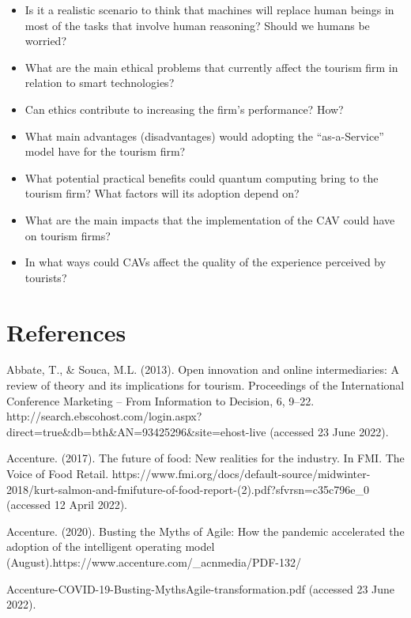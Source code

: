 \documentclass[
  letterpaper,
  DIV=11,
  numbers=noendperiod]{scrreprt}
\begin{document}
\begin{itemize}
\item
  Is it a realistic scenario to think that machines will replace human
  beings in most of the tasks that involve human reasoning? Should we
  humans be worried?
\item
  What are the main ethical problems that currently affect the tourism
  firm in relation to smart technologies?
\item
  Can ethics contribute to increasing the firm's performance? How?
\item
  What main advantages (disadvantages) would adopting the
  ``as-a-Service'' model have for the tourism firm?
\item
  What potential practical benefits could quantum computing bring to the
  tourism firm? What factors will its adoption depend on?
\item
  What are the main impacts that the implementation of the CAV could
  have on tourism firms?
\item
  In what ways could CAVs affect the quality of the experience perceived
  by tourists?
\end{itemize}


\hypertarget{references}{%
\chapter*{References}\label{references}}


Abbate, T., \& Souca, M.L. (2013). Open innovation and online
intermediaries: A review of theory and its implications for tourism.
Proceedings of the International Conference Marketing -- From
Information to Decision, 6, 9--22.
http://search.ebscohost.com/login.aspx?direct=true\&db=bth\&AN=93425296\&site=ehost-live
(accessed 23 June 2022).

Accenture. (2017). The future of food: New realities for the industry.
In FMI. The Voice of Food Retail.
https://www.fmi.org/docs/default-source/midwinter-2018/kurt-salmon-and-fmifuture-of-food-report-(2).pdf?sfvrsn=c35c796e\_0
(accessed 12 April 2022).

Accenture. (2020). Busting the Myths of Agile: How the pandemic
accelerated the adoption of the intelligent operating model
(August).https://www.accenture.com/\_acnmedia/PDF-132/

Accenture-COVID-19-Busting-MythsAgile-transformation.pdf (accessed 23
June 2022).
\end{document}
